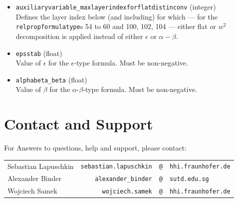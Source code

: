 \documentclass[a4wide]{article}
\begin{document}
\begin{itemize}
\item \texttt{auxiliaryvariable\_maxlayerindexforflatdistinconv} (integer) \\
Defines the layer index below (and including) for which ---  for the  \texttt{relpropformulatype}s 54 to 60 and 100, 102, 104 --- either flat or $w^2$ decomposition is applied instead of either $\epsilon$ or $\alpha-\beta$.

\item \texttt{epsstab} (float) \\
Value of $\epsilon$ for the $\epsilon$-type formula. Must be non-negative.

\item \texttt{alphabeta\_beta} (float) \\
Value of $\beta$ for the $\alpha$-$\beta$-type formula. Must be non-negative.


\end{itemize}









\section{Contact and Support}
\label{sec:contact}

For Answers to questions, help and support, please contact:\\
\begin{tabular}{lrcl}
Sebastian Lapuschkin  & \texttt{sebastian.lapuschkin} & \hspace{-5mm} \texttt{@} & \hspace{-5mm} \texttt{hhi.fraunhofer.de}\\
Alexander Binder  & \texttt{alexander\_binder} & \hspace{-5mm} \texttt{@} & \hspace{-5mm} \texttt{sutd.edu.sg}\\
Wojciech Samek  & \texttt{wojciech.samek} & \hspace{-5mm} \texttt{@} & \hspace{-5mm} \texttt{hhi.fraunhofer.de}
\end{tabular}




\end{document}
